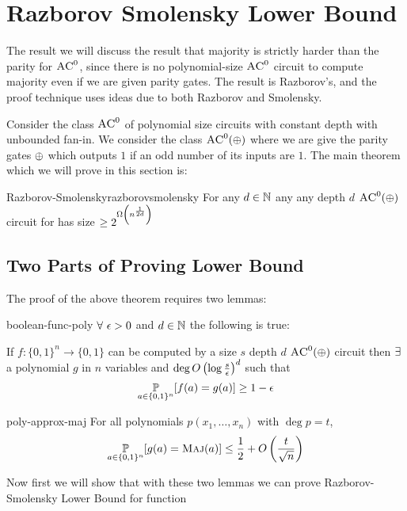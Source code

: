 \section{Razborov Smolensky Lower Bound}
The result we will discuss the result that majority is strictly harder than the parity for $\textsc{AC}^0$, since there is no polynomial-size $\textsc{AC}^0$ circuit to compute majority even if we are given parity gates. The result is Razborov’s, and the proof technique uses ideas due to both Razborov and Smolensky. 

Consider the class $\textsc{AC}^0$ of polynomial size circuits with constant depth  with unbounded fan-in. We consider the class $\textsc{AC}^0(\oplus)$ where we are give the parity gates $\oplus$ which outputs $1$ if an odd number of its inputs are $1$. The main theorem which we will prove in this section is:
\begin{theorem}{Razborov-Smolensky}{razborovsmolensky}
	For any $d\in\mathbb{N}$ any any depth $d$ $\textsc{AC}^0(\oplus)$ circuit for  has size $\geq 2^{\Omega\left(  n^{\frac{1}{2d}}\right)}$
\end{theorem}

\subsection{Two Parts of Proving Lower Bound}
The proof of the above theorem requires two lemmas:

\begin{lemma}{}{boolean-func-poly}
$\forall\ \eps>0$ and $d\in\mathbb{N}$ the following is true:\parinn

If $f:\{0,1\}^n\to \{0,1\}$ can be computed by a size $s$ depth $d$ $\textsc{AC}^0(\oplus)$ circuit then $\exists$ a polynomial $g$ in $n$ variables and $\deg O\left(\log \frac{s}{\epsilon}\right)^d$ such that $$\underset{a\in\{0,1\}^n}{\mathbb{P}}[f(a)=g(a)]\geq 1-\epsilon$$
\end{lemma}
\begin{lemma}{}{poly-approx-maj}
	For all polynomials $p(x_1,\dots, x_n)$ with $\deg p=t$, $$\underset{a\in\{0,1\}^n}{\mathbb{P}}[g(a)=\textsc{Maj}(a)]\leq \frac12+O\left(\frac{t}{\sqrt{n}}\right)$$
\end{lemma}


Now first we will show that with these two lemmas we can prove Razborov-Smolensky Lower Bound for  function

